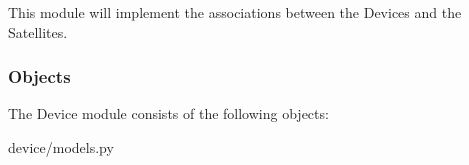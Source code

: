 This module will implement the associations between the Devices and the Satellites. 

\subsubsection{Objects}

The Device module consists of the following objects:

\begin{table}[H]
  \centering
  \caption{device/models.py}
  \label{code:device/models}
  
\end{table}